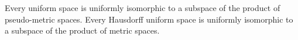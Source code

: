 Every uniform space is uniformly isomorphic to a subspace of the product of pseudo-metric spaces. Every Hausdorff uniform space is uniformly isomorphic to a subspace of the product of metric spaces.
